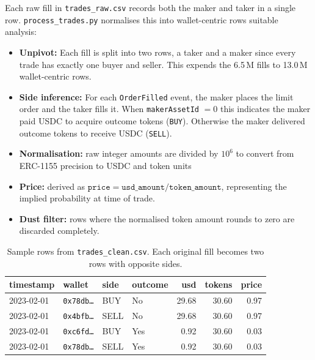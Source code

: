 \documentclass[11pt]{article}
\begin{document}
Each raw fill in \texttt{trades\_raw.csv} records both the maker and
taker in a single row. \texttt{process\_trades.py} normalises this into
wallet-centric rows suitable analysis:

\begin{itemize}
    \item \textbf{Unpivot:} Each fill is split into two rows, a taker and a maker since every trade has exactly one buyer and seller. This expends the 6.5\,M fills to 13.0\,M wallet-centric rows.
    \item \textbf{Side inference:} For each \texttt{OrderFilled} event, 
          the maker places the limit order and the taker fills it. When
          \texttt{makerAssetId} $= 0$ this indicates the maker paid USDC to 
          acquire outcome tokens (\texttt{BUY}). Otherwise the maker 
          delivered outcome tokens to receive USDC (\texttt{SELL}).
    \item \textbf{Normalisation:} raw integer amounts are divided by 
          $10^6$ to convert from ERC-1155 precision to USDC and token units
    \item \textbf{Price:} derived as $\texttt{price} = \texttt{usd\_amount} 
          / \texttt{token\_amount}$, representing the implied probability 
          at time of trade.
    \item \textbf{Dust filter:} rows where the normalised token amount 
          rounds to zero are discarded completely.
\end{itemize}

\begin{table}[H]
\centering
\caption{Sample rows from \texttt{trades\_clean.csv}. Each original
         fill becomes two rows with opposite sides.}
\label{tab:clean_sample}
\small
\begin{tabularx}{\textwidth}{l l l l r r r}
\toprule
\textbf{timestamp} & \textbf{wallet} & \textbf{side} &
\textbf{outcome} & \textbf{usd} & \textbf{tokens} & \textbf{price} \\
\midrule
2023-02-01 & \texttt{0x78db{\ldots}} & BUY  & No  & 29.68 & 30.60 & 0.97 \\
2023-02-01 & \texttt{0x4bfb{\ldots}} & SELL & No  & 29.68 & 30.60 & 0.97 \\
2023-02-01 & \texttt{0xc6fd{\ldots}} & BUY  & Yes &  0.92 & 30.60 & 0.03 \\
2023-02-01 & \texttt{0x78db{\ldots}} & SELL & Yes &  0.92 & 30.60 & 0.03 \\
\bottomrule
\end{tabularx}
\end{table}
\end{document}
